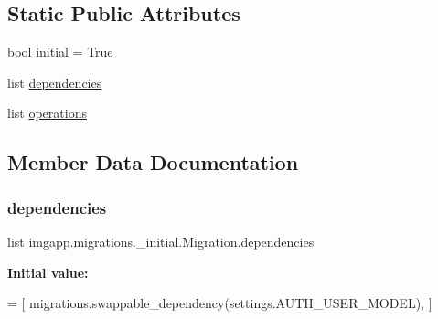 \subsection*{Static Public Attributes}
\begin{DoxyCompactItemize}
\item 
bool \hyperlink{classimgapp_1_1migrations_1_10001__initial_1_1Migration_a9c4795f13c3f1ba0324cabaf163417e5}{initial} = True
\item 
list \hyperlink{classimgapp_1_1migrations_1_10001__initial_1_1Migration_aa54c815fe0f4d4a5d6f1e7303a9843fc}{dependencies}
\item 
list \hyperlink{classimgapp_1_1migrations_1_10001__initial_1_1Migration_ad2e7a56581e2741b53b78c4b28663ff6}{operations}
\end{DoxyCompactItemize}


\subsection{Member Data Documentation}
\mbox{\label{classimgapp_1_1migrations_1_10001__initial_1_1Migration_aa54c815fe0f4d4a5d6f1e7303a9843fc}} 
\subsubsection{\texorpdfstring{dependencies}{dependencies}}
{\footnotesize\ttfamily list imgapp.\+migrations.\+\_\+initial.\+Migration.\+dependencies\hspace{0.3cm}{\ttfamily [static]}}

{\bfseries Initial value\+:}
\begin{DoxyCode}
=  [
        migrations.swappable\_dependency(settings.AUTH\_USER\_MODEL),
    ]
\end{DoxyCode}
\mbox{\label{classimgapp_1_1migrations_1_10001__initial_1_1Migration_a9c4795f13c3f1ba0324cabaf163417e5}} 

